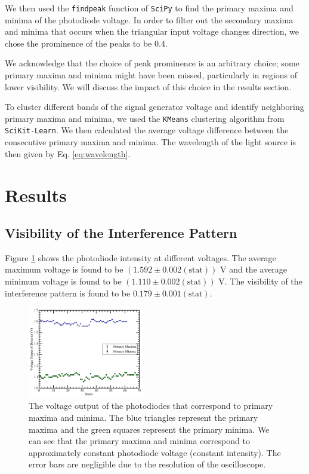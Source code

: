 We then used the \texttt{findpeak} function of \texttt{SciPy} to find the primary maxima and minima of the photodiode voltage. In order to filter out the secondary maxima and minima that occurs when the triangular input voltage changes direction, we chose the prominence of the peaks to be $0.4$. 

We acknowledge that the choice of peak prominence is an arbitrary choice; some primary maxima and minima might have been missed, particularly in regions of lower visibility. We will discuss the impact of this choice in the results section.

To cluster different bands of the signal generator voltage and identify neighboring primary maxima and minima, we used the \texttt{KMeans} clustering algorithm from \texttt{SciKit-Learn}. We then calculated the average voltage difference between the consecutive primary maxima and minima. The wavelength of the light source is then given by Eq. \eqref{eq:wavelength}. 


\section{Results}
\subsection{Visibility of the Interference Pattern}

Figure \ref{fig:intensity} shows the photodiode intensity at different voltages. The average maximum voltage is found to be $(1.592\pm0.002(\text{stat})) \text{ V}$ and the average minimum voltage is found to be $(1.110\pm0.002(\text{stat})) \text{ V}$. The visibility of the interference pattern is found to be $0.179\pm0.001(\text{stat})$.
\begin{figure}
    \centering
    \includegraphics[width=0.45\textwidth]{fig/Intensity.png}
    \caption{The voltage output of the photodiodes that correspond to primary maxima and minima. The blue triangles represent the primary maxima and the green squares represent the primary minima. We can see that the primary maxima and minima correspond to approximately constant photodiode voltage (constant intensity). The error bars are negligible due to the resolution of the oscilloscope.}
    \label{fig:intensity}
\end{figure}

